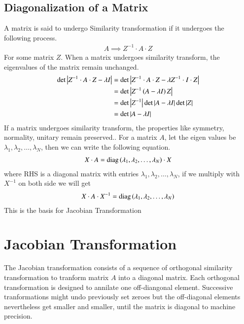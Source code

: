 \documentclass[a4paper,12pt]{article}
\theoremstyle{remark}
\begin{document}
\subsection*{Diagonalization of a Matrix}
A matrix is said to undergo Similarity transformation if it undergoes the following process.
\begin{align}
	A \implies Z^{-1}\cdot A\cdot Z
\end{align}
For some matrix $Z$. When a matrix undergoes similarity transform, the eigenvalues of the matrix remain unchanged.
\begin{align}
	\det\left\vert Z^{-1}\cdot A\cdot Z - \lambda I\right\vert &= \det\left\vert Z^{-1}\cdot A\cdot Z - \lambda Z^{-1}\cdot I\cdot Z\right\vert\\
		&= \det\left\vert Z^{-1}\left(A - \lambda I \right)Z\right\vert\\
		&= \det\left\vert Z^{-1}\right\vert\det\left\vert A - \lambda I\right\vert\det\left\vert Z\right\vert\\
		&= \det\left\vert A - \lambda I\right\vert 
\end{align}
If a matrix undergoes similarity transform, the properties like symmetry, normality, unitary remain preserved..
For a matrix $A$, let the eigen values be $\lambda_1, \lambda_2,\dots,\lambda_N$, then we can write the following equation.
\begin{align}
	X\cdot A= \text{diag}\left(\lambda_1, \lambda_2,\dots,\lambda_N\right)\cdot X\\
\end{align}
where RHS is a diagonal matrix with entries $\lambda_1, \lambda_2,\dots,\lambda_N$, if we multiply with $X^{-1}$ on both side we will get
\begin{align}
	X \cdot A \cdot X^{-1} = \text{diag}\left(\lambda_1, \lambda_2,\dots,\lambda_N\right)
\end{align}
This is the basis for Jacobian Transformation

\section{Jacobian Transformation}
The Jacobian transformation consists of a sequence of orthogonal similarity transformation  to tranform matrix $A$ into a diagonal matrix. Each orthogonal transformation is designed to annilate one off-diangonal element. Successive tranformations might undo previously set zeroes but the off-diagonal elements nevertheless get smaller and smaller, until the matrix is diagonal to machine precision.
\end{document}
